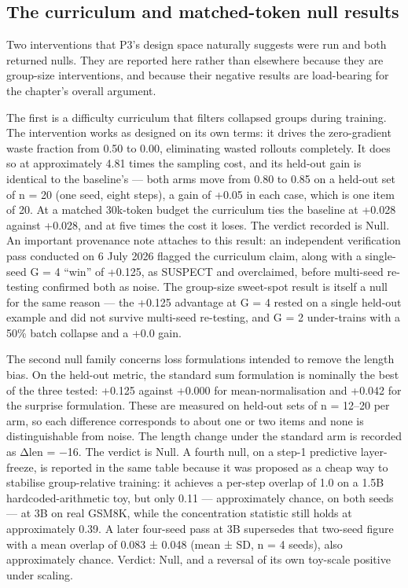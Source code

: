 \documentclass[12pt,a4paper]{report}
\begin{document}
\subsection{The curriculum and matched-token null
results}\label{the-curriculum-and-matched-token-null-results}

Two interventions that P3's design space naturally suggests were run and
both returned nulls. They are reported here rather than elsewhere
because they are group-size interventions, and because their negative
results are load-bearing for the chapter's overall argument.

The first is a difficulty curriculum that filters collapsed groups
during training. The intervention works as designed on its own terms: it
drives the zero-gradient waste fraction from 0.50 to 0.00, eliminating
wasted rollouts completely. It does so at approximately 4.81 times the
sampling cost, and its held-out gain is identical to the baseline's ---
both arms move from 0.80 to 0.85 on a held-out set of n = 20 (one seed,
eight steps), a gain of +0.05 in each case, which is one item of 20. At
a matched 30k-token budget the curriculum ties the baseline at +0.028
against +0.028, and at five times the cost it loses. The verdict
recorded is Null. An important provenance note attaches to this result:
an independent verification pass conducted on 6 July 2026 flagged the
curriculum claim, along with a single-seed G = 4 ``win'' of +0.125, as
SUSPECT and overclaimed, before multi-seed re-testing confirmed both as
noise. The group-size sweet-spot result is itself a null for the same
reason --- the +0.125 advantage at G = 4 rested on a single held-out
example and did not survive multi-seed re-testing, and G = 2
under-trains with a 50\% batch collapse and a +0.0 gain.

The second null family concerns loss formulations intended to remove the
length bias. On the held-out metric, the standard sum formulation is
nominally the best of the three tested: +0.125 against +0.000 for
mean-normalisation and +0.042 for the surprise formulation. These are
measured on held-out sets of n = 12--20 per arm, so each difference
corresponds to about one or two items and none is distinguishable from
noise. The length change under the standard arm is recorded as Δlen =
−16. The verdict is Null. A fourth null, on a step-1 predictive
layer-freeze, is reported in the same table because it was proposed as a
cheap way to stabilise group-relative training: it achieves a per-step
overlap of 1.0 on a 1.5B hardcoded-arithmetic toy, but only 0.11 ---
approximately chance, on both seeds --- at 3B on real GSM8K, while the
concentration statistic still holds at approximately 0.39. A later
four-seed pass at 3B supersedes that two-seed figure with a mean overlap
of 0.083 ± 0.048 (mean ± SD, n = 4 seeds), also approximately chance.
Verdict: Null, and a reversal of its own toy-scale positive under
scaling.
\end{document}
